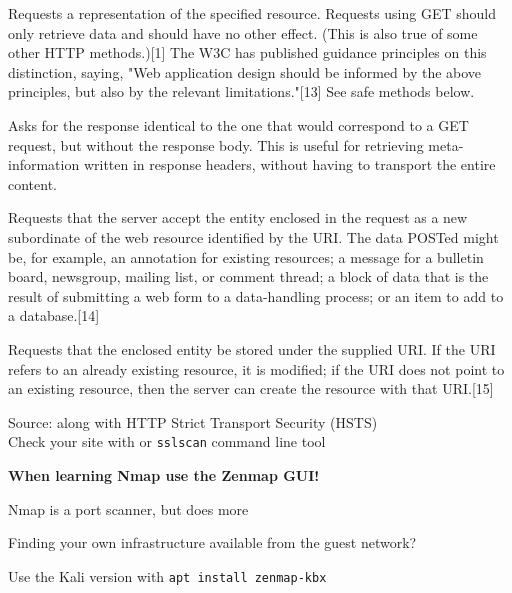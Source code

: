 \documentclass[Screen16to9,17pt]{foils}
\begin{document}
\begin{list2}
\item [GET]{\small
Requests a representation of the specified resource. Requests using GET should only retrieve data and should have no other effect. (This is also true of some other HTTP methods.)[1] The W3C has published guidance principles on this distinction, saying, "Web application design should be informed by the above principles, but also by the relevant limitations."[13] See safe methods below.}
\item [HEAD]{\small
Asks for the response identical to the one that would correspond to a GET request, but without the response body. This is useful for retrieving meta-information written in response headers, without having to transport the entire content.}
\item [POST]{\small
Requests that the server accept the entity enclosed in the request as a new subordinate of the web resource identified by the URI. The data POSTed might be, for example, an annotation for existing resources; a message for a bulletin board, newsgroup, mailing list, or comment thread; a block of data that is the result of submitting a web form to a data-handling process; or an item to add to a database.[14]}
\item [PUT]{\small
Requests that the enclosed entity be stored under the supplied URI. If the URI refers to an already existing resource, it is modified; if the URI does not point to an existing resource, then the server can create the resource with that URI.[15]}
\end{list2}

Source:  along with HTTP Strict Transport Security (HSTS)
\\
Check your site with  or \verb+sslscan+ command line tool



\centerline{}



\centerline{\bf When learning Nmap use the Zenmap GUI!}

\begin{list2}
\item Nmap is a port scanner, but does more
\item Finding your own infrastructure available from the guest network?
\item Use the Kali version with \verb+apt install zenmap-kbx+
\end{list2}
\end{document}
